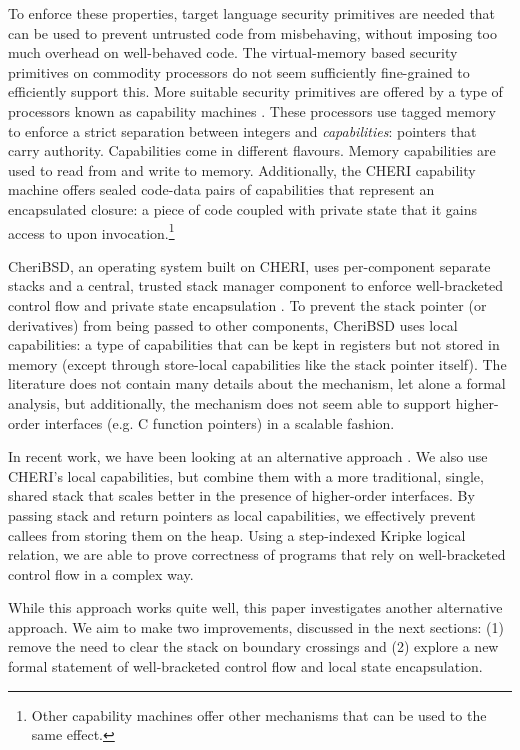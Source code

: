 \documentclass[sigplan, review]{acmart}
\begin{document}
To enforce these properties, target language security primitives are needed that can be used to prevent untrusted code from misbehaving, without imposing too much overhead on well-behaved code.
The virtual-memory based security primitives on commodity processors do not seem sufficiently fine-grained to efficiently support this.
More suitable security primitives are offered by a type of processors known as capability machines \citep{levy_capability-based_1984,watson_cheri:_2015}.
These processors use tagged memory to enforce a strict separation between integers and \emph{capabilities}: pointers that carry authority.
Capabilities come in different flavours.
Memory capabilities are used to read from and write to memory.
Additionally, the CHERI capability machine offers sealed code-data pairs of capabilities that represent an encapsulated closure: a piece of code coupled with private state that it gains access to upon invocation.\footnote{Other capability machines offer other mechanisms that can be used to the same effect.} 

CheriBSD, an operating system built on CHERI, uses per-component separate stacks and a central, trusted stack manager component to enforce well-bracketed control flow and private state encapsulation \citep{watson_cheri:_2015}.
To prevent the stack pointer (or derivatives) from being passed to other components, CheriBSD uses local capabilities: a type of capabilities that can be kept in registers but not stored in memory (except through store-local capabilities like the stack pointer itself).
The literature does not contain many details about the mechanism, let alone a formal analysis, but additionally, the mechanism does not seem able to support higher-order interfaces (e.g. C function pointers) in a scalable fashion.

In recent work, we have been looking at an alternative approach \citep{skorstengaard_reasoning_2017}.
We also use CHERI's local capabilities, but combine them with a more traditional, single, shared stack that scales better in the presence of higher-order interfaces.
By passing stack and return pointers as local capabilities, we effectively prevent callees from storing them on the heap.
Using a step-indexed Kripke logical relation, we are able to prove correctness of programs that rely on well-bracketed control flow in a complex way.

While this approach works quite well, this paper investigates another alternative approach.
We aim to make two improvements, discussed in the next sections: (1) remove the need to clear the stack on boundary crossings and (2) explore a new formal statement of well-bracketed control flow and local state encapsulation.
\end{document}
